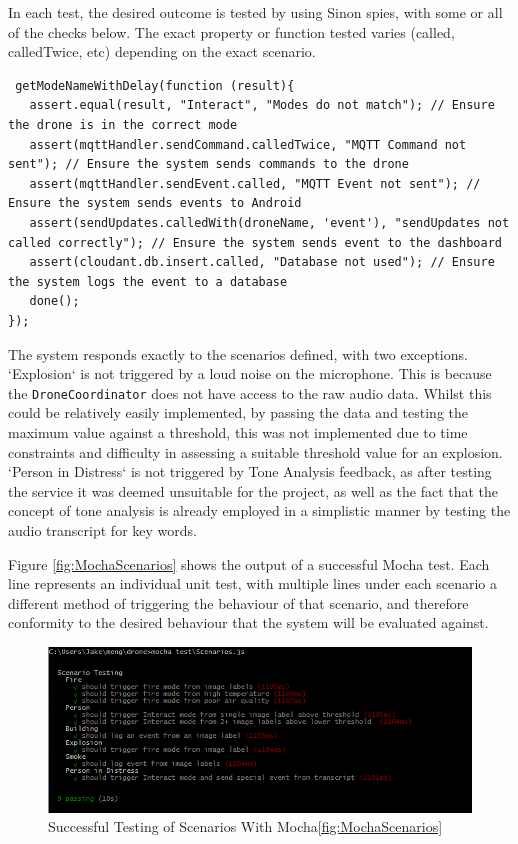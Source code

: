 \documentclass{article}
\begin{document}
In each test, the desired outcome is tested by using Sinon spies, with some or all of the checks below. The exact property or function tested varies (called, calledTwice, etc) depending on the exact scenario.
\begin{lstlisting}
 getModeNameWithDelay(function (result){
   assert.equal(result, "Interact", "Modes do not match"); // Ensure the drone is in the correct mode
   assert(mqttHandler.sendCommand.calledTwice, "MQTT Command not sent"); // Ensure the system sends commands to the drone
   assert(mqttHandler.sendEvent.called, "MQTT Event not sent"); // Ensure the system sends events to Android
   assert(sendUpdates.calledWith(droneName, 'event'), "sendUpdates not called correctly"); // Ensure the system sends event to the dashboard
   assert(cloudant.db.insert.called, "Database not used"); // Ensure the system logs the event to a database
   done();               
});
\end{lstlisting}

The system responds exactly to the scenarios defined, with two exceptions. `Explosion` is not triggered by a loud noise on the microphone. This is because the \texttt{DroneCoordinator} does not have access to the raw audio data. Whilst this could be relatively easily implemented, by passing the data and testing the maximum value against a threshold, this was not implemented due to time constraints and difficulty in assessing a suitable threshold value for an explosion. `Person in Distress` is not triggered by Tone Analysis feedback, as after testing the service it was deemed unsuitable for the project, as well as the fact that the concept of tone analysis is already employed in a simplistic manner by testing the audio transcript for key words.

Figure \ref{fig:MochaScenarios} shows the output of a successful Mocha test. Each line represents an individual unit test, with multiple lines under each scenario a different method of triggering the behaviour of that scenario, and therefore conformity to the desired behaviour that the system will be evaluated against. 

\begin{figure}[h]
\centering
\caption{Successful Testing of Scenarios With Mocha\ref{fig:MochaScenarios}}
\includegraphics[width=\textwidth]{MochaScenarios}
\end{figure}
\end{document}

